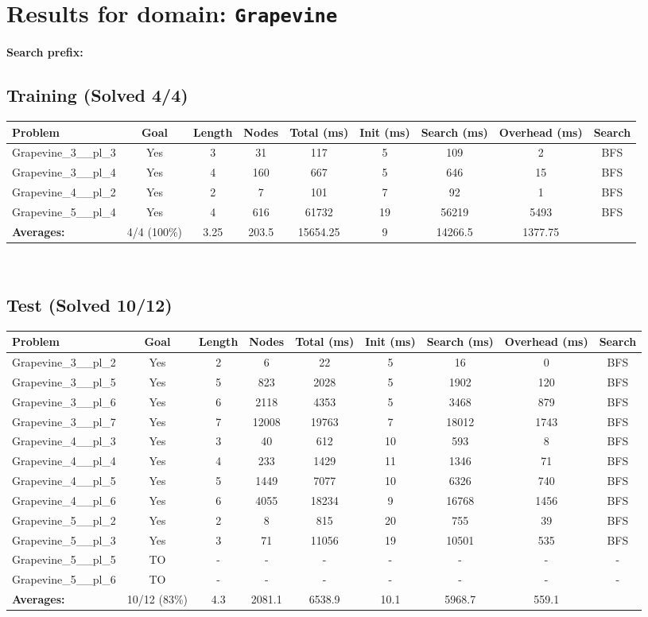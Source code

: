 \documentclass{article}
\begin{document}
\section*{Results for domain: \texttt{Grapevine}}
\textbf{Search prefix:} 
\\[0.5cm]
\subsection*{Training (Solved 4/4)}
\begin{tabular}{lcccccccc}
\toprule
Problem & Goal & Length & Nodes & Total (ms) & Init (ms) & Search (ms) & Overhead (ms) & Search \\
\midrule
Grapevine\_3\_\_pl\_3 & Yes & 3 & 31 & 117 & 5 & 109 & 2 & BFS \\
Grapevine\_3\_\_pl\_4 & Yes & 4 & 160 & 667 & 5 & 646 & 15 & BFS \\
Grapevine\_4\_\_pl\_2 & Yes & 2 & 7 & 101 & 7 & 92 & 1 & BFS \\
Grapevine\_5\_\_pl\_4 & Yes & 4 & 616 & 61732 & 19 & 56219 & 5493 & BFS \\
\textbf{Averages:} & 4/4 (100\%) & 3.25 & 203.5 & 15654.25 & 9 & 14266.5 & 1377.75 & \\
\bottomrule
\end{tabular}
\\[0.7cm]
\subsection*{Test (Solved 10/12)}
\begin{tabular}{lcccccccc}
\toprule
Problem & Goal & Length & Nodes & Total (ms) & Init (ms) & Search (ms) & Overhead (ms) & Search \\
\midrule
Grapevine\_3\_\_pl\_2 & Yes & 2 & 6 & 22 & 5 & 16 & 0 & BFS \\
Grapevine\_3\_\_pl\_5 & Yes & 5 & 823 & 2028 & 5 & 1902 & 120 & BFS \\
Grapevine\_3\_\_pl\_6 & Yes & 6 & 2118 & 4353 & 5 & 3468 & 879 & BFS \\
Grapevine\_3\_\_pl\_7 & Yes & 7 & 12008 & 19763 & 7 & 18012 & 1743 & BFS \\
Grapevine\_4\_\_pl\_3 & Yes & 3 & 40 & 612 & 10 & 593 & 8 & BFS \\
Grapevine\_4\_\_pl\_4 & Yes & 4 & 233 & 1429 & 11 & 1346 & 71 & BFS \\
Grapevine\_4\_\_pl\_5 & Yes & 5 & 1449 & 7077 & 10 & 6326 & 740 & BFS \\
Grapevine\_4\_\_pl\_6 & Yes & 6 & 4055 & 18234 & 9 & 16768 & 1456 & BFS \\
Grapevine\_5\_\_pl\_2 & Yes & 2 & 8 & 815 & 20 & 755 & 39 & BFS \\
Grapevine\_5\_\_pl\_3 & Yes & 3 & 71 & 11056 & 19 & 10501 & 535 & BFS \\
Grapevine\_5\_\_pl\_5 & TO & - & - & - & - & - & - & - \\
Grapevine\_5\_\_pl\_6 & TO & - & - & - & - & - & - & - \\
\textbf{Averages:} & 10/12 (83\%) & 4.3 & 2081.1 & 6538.9 & 10.1 & 5968.7 & 559.1 & \\
\bottomrule
\end{tabular}
\\[0.7cm]
\end{document}
